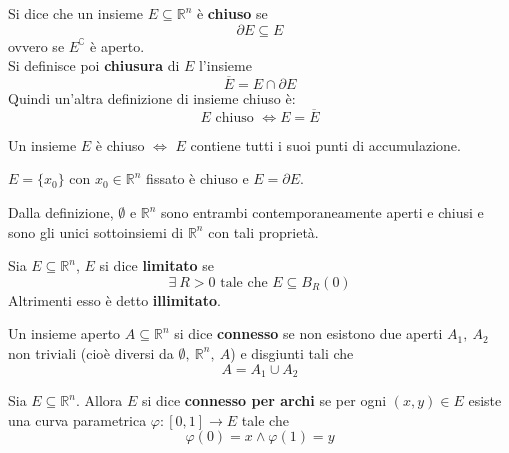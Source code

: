 \begin{definition} \label{Def: Insieme chiuso e chiusura}
    Si dice che un insieme $E \subseteq \mathbb{R}^n$ è \textbf{chiuso} se 
    \begin{equation*}
        \partial{E} \subseteq E
    \end{equation*}
    ovvero se $E^\complement$ è aperto.\\
    Si definisce poi \textbf{chiusura} di $E$ l'insieme
    \begin{equation*}
        \overline{E} = E \cap \partial{E}
    \end{equation*}
    Quindi un'altra definizione di insieme chiuso è:
    \begin{equation*}
        E \text{ chiuso } \iff E=\overline{E}
    \end{equation*}
\end{definition}
\begin{proposition}
    Un insieme $E$ è chiuso $\iff$ $E$ contiene tutti i suoi punti di accumulazione.
\end{proposition}
\begin{oss}
    $E=\{x_0\}$ con $x_0 \in \mathbb{R}^n$ fissato è chiuso e $E=\partial{E}$.
\end{oss}
\begin{oss}
    Dalla definizione, $\emptyset$ e $\mathbb{R}^n$ sono entrambi contemporaneamente aperti e chiusi e sono gli unici sottoinsiemi di $\mathbb{R}^n$ con tali proprietà.
\end{oss}
\begin{definition}
    Sia $E \subseteq \mathbb{R}^n$, $E$ si dice \textbf{limitato} se
    \begin{equation*}
        \exists\ R>0 \text{ tale che } E \subseteq B_R(0)
    \end{equation*}
    Altrimenti esso è detto \textbf{illimitato}.
\end{definition}
\begin{definition}
    Un insieme aperto $A\subseteq \mathbb{R}^n$ si dice \textbf{connesso} se non esistono due aperti $A_1, \ A_2$ non triviali (cioè diversi da $\emptyset,\ \mathbb{R}^n,\ A$) e disgiunti tali che
    \begin{equation*}
        A=A_1 \cup A_2
    \end{equation*}
\end{definition}
\begin{definition}
    Sia $E \subseteq \mathbb{R}^n$. Allora $E$ si dice \textbf{connesso per archi} se per ogni $(x,y) \in E$ esiste una curva parametrica $\varphi:[0,1] \to E$ tale che
    \begin{equation*}
        \varphi(0)=x \land \varphi(1)=y
    \end{equation*}
\end{definition}
